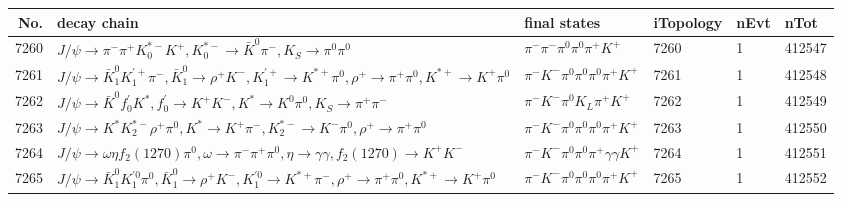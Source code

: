 \begin{table}[htbp] 
\begin{center}
\begin{small}
\begin{tabular}{rlllll}\hline\hline
 No. & decay chain & final states &  iTopology & nEvt & nTot \\\hline
7260&$J/\psi       \rightarrow \pi^{-}        \pi^{+}        K_{0}^{*-}     K^{+}          , K_{0}^{*-}      \rightarrow \bar{K}^{0}   \pi^{-}        , K_{S}           \rightarrow \pi^{0}        \pi^{0}        $&$\pi^{-}        \pi^{-}        \pi^{0}        \pi^{0}        \pi^{+}        K^{+}          $& 7260&    1&412547\\
7261&$J/\psi       \rightarrow \bar{K}_1^{0} K_1^{'+}      \pi^{-}        , \bar{K}_1^{0}  \rightarrow \rho^{+}      K^{-}          , K_1^{'+}       \rightarrow K^{*+}         \pi^{0}        , \rho^{+}       \rightarrow \pi^{+}        \pi^{0}        , K^{*+}          \rightarrow K^{+}          \pi^{0}        $&$\pi^{-}        K^{-}          \pi^{0}        \pi^{0}        \pi^{0}        \pi^{+}        K^{+}          $& 7261&    1&412548\\
7262&$J/\psi       \rightarrow \bar{K}^{0}   f^{'}_{0}     K^{*}          , f^{'}_{0}      \rightarrow K^{+}          K^{-}          , K^{*}           \rightarrow K^{0}          \pi^{0}        , K_{S}           \rightarrow \pi^{+}        \pi^{-}        $&$\pi^{-}        K^{-}          \pi^{0}        K_{L}          \pi^{+}        K^{+}          $& 7262&    1&412549\\
7263&$J/\psi       \rightarrow K^{*}          K_2^{*-}       \rho^{+}      \pi^{0}        , K^{*}           \rightarrow K^{+}          \pi^{-}        , K_2^{*-}        \rightarrow K^{-}          \pi^{0}        , \rho^{+}       \rightarrow \pi^{+}        \pi^{0}        $&$\pi^{-}        K^{-}          \pi^{0}        \pi^{0}        \pi^{0}        \pi^{+}        K^{+}          $& 7263&    1&412550\\
7264&$J/\psi       \rightarrow \omega         \eta          f_{2}(1270)    \pi^{0}        , \omega          \rightarrow \pi^{-}        \pi^{+}        \pi^{0}        , \eta           \rightarrow \gamma       \gamma       , f_{2}(1270)     \rightarrow K^{+}          K^{-}          $&$\pi^{-}        K^{-}          \pi^{0}        \pi^{0}        \pi^{+}        \gamma       \gamma       K^{+}          $& 7264&    1&412551\\
7265&$J/\psi       \rightarrow \bar{K}_1^{0} K_1^{'0}      \pi^{0}        , \bar{K}_1^{0}  \rightarrow \rho^{+}      K^{-}          , K_1^{'0}       \rightarrow K^{*+}         \pi^{-}        , \rho^{+}       \rightarrow \pi^{+}        \pi^{0}        , K^{*+}          \rightarrow K^{+}          \pi^{0}        $&$\pi^{-}        K^{-}          \pi^{0}        \pi^{0}        \pi^{0}        \pi^{+}        K^{+}          $& 7265&    1&412552\\

\end{tabular}
\end{small}
\end{center}
\end{table}
